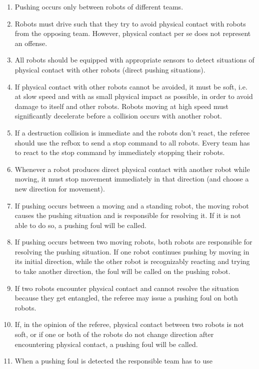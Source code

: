 \documentclass[12pt,twoside]{article}
\begin{document}
\begin{enumerate}
\item Pushing occurs only between robots of different teams.
\item Robots must drive such that they try to avoid physical contact
  with robots from the opposing team. However, physical contact per se
  does not represent an offense.
\item All robots should be equipped with appropriate sensors to detect 
situations of physical contact with other robots (direct pushing situations).
\item If physical contact with other robots cannot be avoided, it must
  be soft, i.e. at slow speed and with as small physical impact as
  possible, in order to avoid damage to itself and other
  robots. Robots moving at high speed must significantly decelerate
  before a collision occurs with another robot.
\item If a destruction collision is immediate and the robots don't
  react, the referee should use the refbox to send a stop command to
  all robots. Every team has to react to the stop command by
  immediately stopping their robots.
\item Whenever a robot produces direct physical contact with another
  robot while moving, it must stop movement immediately in that
  direction (and choose a new direction for movement).
\item If pushing occurs between a moving and a standing robot, the
  moving robot causes the pushing situation and is responsible for
  resolving it. If it is not able to do so, a pushing foul will be
  called.
\item If pushing occurs between two moving robots, both robots are
  responsible for resolving the pushing situation. If one robot
  continues pushing by moving in its initial direction, while the
  other robot is recognizably reacting and trying to take another
  direction, the foul will be called on the pushing robot.
\item If two robots encounter physical contact and cannot resolve the
  situation because they get entangled, the referee may issue a
  pushing foul on both robots.
\item If, in the opinion of the referee, physical contact between two
  robots is not soft, or if one or both of the robots do not change
  direction after encountering physical contact, a pushing foul will
  be called.
\item When a pushing foul is detected the responsible team has to use

\end{enumerate}
\end{document}
